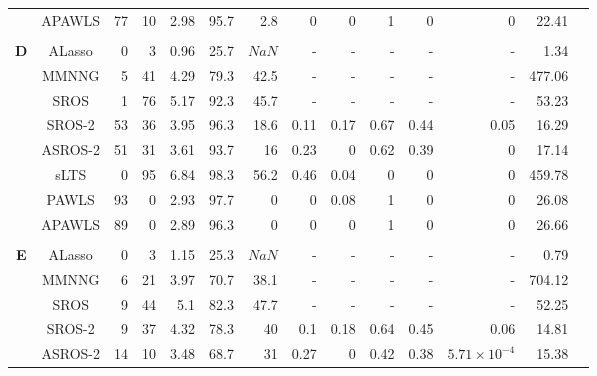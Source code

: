 \documentclass{article}\usepackage[]{graphicx}\usepackage[]{color}
\begin{document}
\begin{table}[thp]
\begin{center}
\begin{tabular}{ccrrrrrrrrrrrr}
	      & APAWLS & 77 & 10 & 2.98 & 
	      95.7 & 2.8 &
	      0 & 0 & 1
	      & 0 & 0 & 22.41\\
	      
	     \\
	       	  \multirow{8}{*}{{\bf D}}
	      & ALasso & 0 & 3 & 0.96 & 
	      25.7 & \ensuremath{NaN} & - & - & - & - & - & 1.34\\
	
	      & MMNNG & 5 & 41 & 4.29 & 
	      79.3 & 42.5 & - & - & - & - & - & 477.06\\
	      
	      & SROS & 1 & 76 & 5.17 & 
	      92.3 & 45.7 & - & - & - & - & - & 53.23\\
	      
	      & SROS-2 & 53 & 36 & 3.95 & 
	      96.3 & 18.6 &
	      0.11 & 0.17 & 0.67
	      & 0.44 & 0.05 & 16.29\\
	      
	     & ASROS-2 & 51 & 31 & 3.61 & 
	      93.7 & 16 &
	      0.23 & 0 & 0.62
	      & 0.39 & 0 & 17.14\\
	      
	       & sLTS & 0 & 95 & 6.84 & 
	      98.3 & 56.2 &
	      0.46 & 0.04 & 0
	      & 0 & 0 & 459.78\\
	      
	      & PAWLS & 93 & 0 & 2.93 & 
	      97.7 & 0 &
	      0 & 0.08 & 1
	      & 0 & 0 & 26.08\\
	      
	      & APAWLS & 89 & 0 & 2.89 & 
	      96.3 & 0 &
	      0 & 0 & 1
	      & 0 & 0 & 26.66\\
	      
	      \\
	       	  \multirow{8}{*}{{\bf E}}
	      & ALasso & 0 & 3 & 1.15 & 
	      25.3 & \ensuremath{NaN} & - & - & - & - & - & 0.79\\
	
	      & MMNNG & 6 & 21 & 3.97 & 
	      70.7 & 38.1 & - & - & - & - & - & 704.12\\
	      
	      & SROS & 9 & 44 & 5.1 & 
	      82.3 & 47.7 & - & - & - & - & - & 52.25\\
	      
	      & SROS-2 & 9 & 37 & 4.32 & 
	      78.3 & 40 &
	      0.1 & 0.18 & 0.64
	      & 0.45 & 0.06 & 14.81\\
	      
	     & ASROS-2 & 14 & 10 & 3.48 & 
	      68.7 & 31 &
	      0.27 & 0 & 0.42
	      & 0.38 & \ensuremath{5.71\times 10^{-4}} & 15.38\\
	      

\end{tabular}
\end{center}
\end{table}
\end{document}
